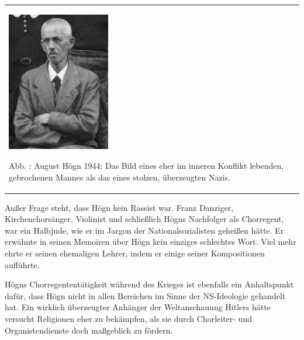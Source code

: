 \documentclass[a4paper]{article}
\newcounter{Abb}
\renewcommand\theAbb{\arabic{Abb}}
\begin{document}
\begin{center}
\begin{minipage}{4.928cm}
\begin{flushleft}
\tablefirsthead{}
\tablehead{}
\tabletail{}
\tablelasttail{}
\begin{supertabular}{m{4.728cm}}

\includegraphics[width=4.503cm,height=6.103cm]{pictures/zulassungsarbeit-img036.jpg}

Abb. \stepcounter{Abb}{\theAbb}: August Högn 1944: Das Bild eines eher
im inneren Konflikt lebenden, gebrochenen Mannes als das eines stolzen,
überzeugten Nazis.\\
\end{supertabular}
\end{flushleft}
\end{minipage}
\end{center}
Außer Frage steht, dass Högn kein Rassist war. Franz Danziger,
Kirchenchorsänger, Violinist und schließlich Högns Nachfolger als
Chorregent, war ein Halbjude, wie er im Jargon der Nationalsozialisten
geheißen hätte. Er erwähnte in seinen Memoiren über Högn kein einziges
schlechtes Wort. Viel mehr ehrte er seinen ehemaligen Lehrer, indem er
einige seiner Kompositionen aufführte.

Högns Chorregententätigkeit während des Krieges ist ebenfalls ein
Anhaltspunkt dafür, dass Högn nicht in allen Bereichen im Sinne der
NS-Ideologie gehandelt hat. Ein wirklich überzeugter Anhänger der
Weltanschauung Hitlers hätte versucht Religionen eher zu bekämpfen, als
sie durch Chorleiter- und Organistendienste doch maßgeblich zu fördern.
\end{document}
